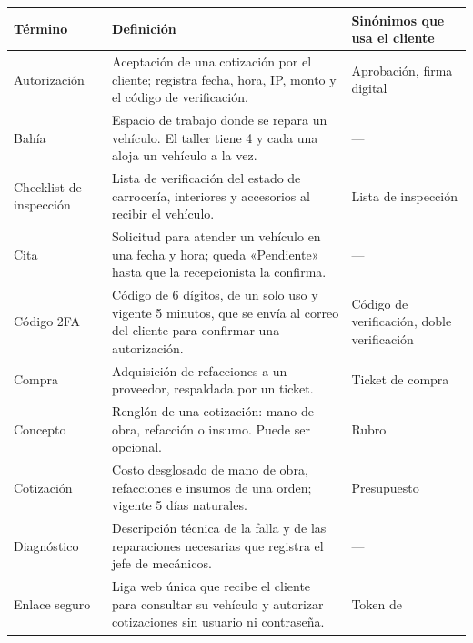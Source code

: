 {\def\LTcaptype{none} %
\begin{longtable}[]{@{}
  >{\raggedright\arraybackslash}p{}
  >{\raggedright\arraybackslash}p{}
  >{\raggedright\arraybackslash}p{}@{}}
\toprule\noalign{}
\begin{minipage}[b]{\linewidth}\raggedright
\textbf{Término}
\end{minipage} & \begin{minipage}[b]{\linewidth}\raggedright
\textbf{Definición}
\end{minipage} & \begin{minipage}[b]{\linewidth}\raggedright
\textbf{Sinónimos que usa el cliente}
\end{minipage} \\
\midrule\noalign{}
\endhead
\bottomrule\noalign{}
\endlastfoot
Autorización & Aceptación de una cotización por el cliente; registra
fecha, hora, IP, monto y el código de verificación. & Aprobación, firma
digital \\
Bahía & Espacio de trabajo donde se repara un vehículo. El taller tiene
4 y cada una aloja un vehículo a la vez. & --- \\
Checklist de inspección & Lista de verificación del estado de
carrocería, interiores y accesorios al recibir el vehículo. & Lista de
inspección \\
Cita & Solicitud para atender un vehículo en una fecha y hora; queda
«Pendiente» hasta que la recepcionista la confirma. & --- \\
Código 2FA & Código de 6 dígitos, de un solo uso y vigente 5 minutos,
que se envía al correo del cliente para confirmar una autorización. &
Código de verificación, doble verificación \\
Compra & Adquisición de refacciones a un proveedor, respaldada por un
ticket. & Ticket de compra \\
Concepto & Renglón de una cotización: mano de obra, refacción o insumo.
Puede ser opcional. & Rubro \\
Cotización & Costo desglosado de mano de obra, refacciones e insumos de
una orden; vigente 5 días naturales. & Presupuesto \\
Diagnóstico & Descripción técnica de la falla y de las reparaciones
necesarias que registra el jefe de mecánicos. & --- \\
Enlace seguro & Liga web única que recibe el cliente para consultar su
vehículo y autorizar cotizaciones sin usuario ni contraseña. & Token de

\end{longtable}}
